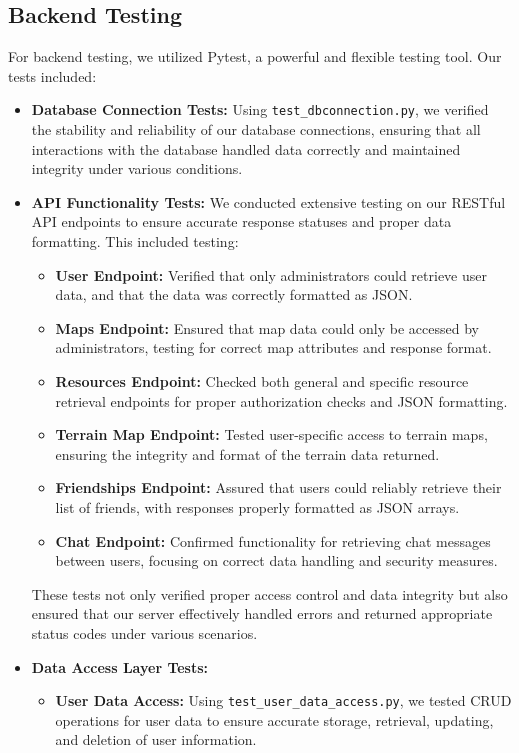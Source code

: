 \documentclass[12pt]{article}
\begin{document}
\begin{itemize}
\subsection{Backend Testing}
For backend testing, we utilized Pytest, a powerful and flexible testing tool. Our tests included:
\begin{itemize}
    \item \textbf{Database Connection Tests:} Using \texttt{test\_dbconnection.py}, we verified the stability and reliability of our database connections, ensuring that all interactions with the database handled data correctly and maintained integrity under various conditions.
    \item \textbf{API Functionality Tests:} We conducted extensive testing on our RESTful API endpoints to ensure accurate response statuses and proper data formatting. This included testing:
        \begin{itemize}
            \item \textbf{User Endpoint:} Verified that only administrators could retrieve user data, and that the data was correctly formatted as JSON.
            \item \textbf{Maps Endpoint:} Ensured that map data could only be accessed by administrators, testing for correct map attributes and response format.
            \item \textbf{Resources Endpoint:} Checked both general and specific resource retrieval endpoints for proper authorization checks and JSON formatting.
            \item \textbf{Terrain Map Endpoint:} Tested user-specific access to terrain maps, ensuring the integrity and format of the terrain data returned.
            \item \textbf{Friendships Endpoint:} Assured that users could reliably retrieve their list of friends, with responses properly formatted as JSON arrays.
            \item \textbf{Chat Endpoint:} Confirmed functionality for retrieving chat messages between users, focusing on correct data handling and security measures.
        \end{itemize}
    These tests not only verified proper access control and data integrity but also ensured that our server effectively handled errors and returned appropriate status codes under various scenarios.
    \item \textbf{Data Access Layer Tests:}
    \begin{itemize}
        \item \textbf{User Data Access:} Using \texttt{test\_user\_data\_access.py}, we tested CRUD operations for user data to ensure accurate storage, retrieval, updating, and deletion of user information.

\end{itemize}
\end{itemize}
\end{itemize}
\end{document}
